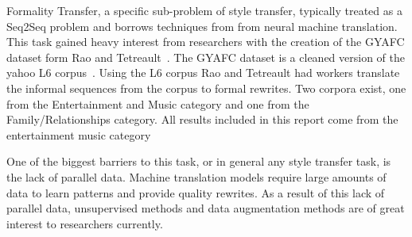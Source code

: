 \documentclass[12pt]{article}
\begin{document}
Formality Transfer, a specific sub-problem of style transfer, 
typically treated as a Seq2Seq problem and borrows techniques from 
from neural machine translation. This task gained heavy interest from researchers 
with the creation of the GYAFC dataset form Rao and Tetreault~\cite{rao2018dear}.
The GYAFC dataset is a cleaned version of the yahoo L6 corpus~\cite{yahooaaa}. 
Using the L6 corpus Rao and Tetreault had workers translate the informal sequences 
from the corpus to formal rewrites. Two corpora exist, one from the Entertainment and Music category 
and one from the Family/Relationships category. All results included in this report come from the 
entertainment music category

\par One of the biggest barriers to this task, or in general any 
style transfer task, is the lack of parallel data. Machine translation models require large amounts
of data to learn patterns and provide quality rewrites. As a result of this lack of parallel data,
unsupervised methods 
and data augmentation methods are of great interest to researchers currently. 
\end{document}
